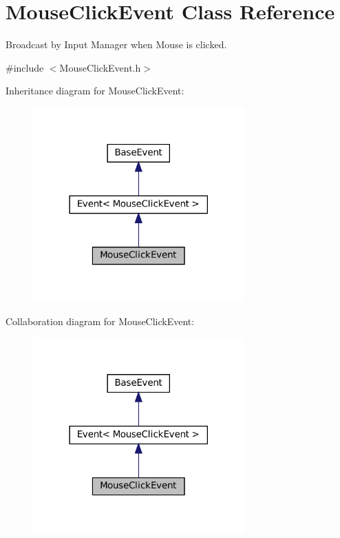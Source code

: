 \hypertarget{classMouseClickEvent}{}\section{Mouse\+Click\+Event Class Reference}
\label{classMouseClickEvent}


Broadcast by Input Manager when Mouse is clicked.  




{\ttfamily \#include $<$Mouse\+Click\+Event.\+h$>$}



Inheritance diagram for Mouse\+Click\+Event\+:
\nopagebreak
\begin{figure}[H]
\begin{center}
\leavevmode
\includegraphics[width=230pt]{classMouseClickEvent__inherit__graph}
\end{center}
\end{figure}


Collaboration diagram for Mouse\+Click\+Event\+:
\nopagebreak
\begin{figure}[H]
\begin{center}
\leavevmode
\includegraphics[width=230pt]{classMouseClickEvent__coll__graph}
\end{center}
\end{figure}
